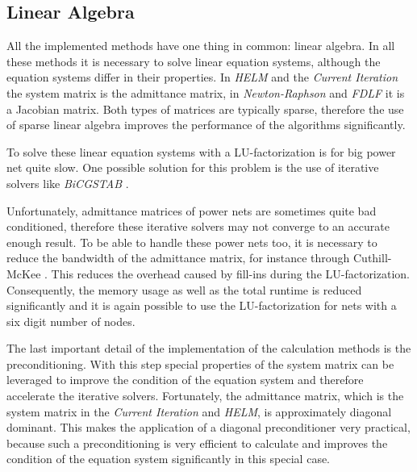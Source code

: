 \subsection{Linear Algebra}
All the implemented methods have one thing in common: linear algebra. In all these methods it is necessary to solve linear equation systems, although the equation systems differ in their properties. In \emph{HELM} and the \emph{Current Iteration} the system matrix is the admittance matrix, in \emph{Newton-Raphson} and \emph{FDLF} it is a Jacobian matrix. Both types of matrices are typically sparse, therefore the use of sparse linear algebra improves the performance of the algorithms significantly.

To solve these linear equation systems with a LU-factorization is for big power net quite slow. One possible  solution for this problem is the use of iterative solvers like \emph{BiCGSTAB} \cite{bicgstab}.

Unfortunately, admittance matrices of power nets are sometimes quite bad conditioned, therefore these iterative solvers may not converge to an accurate enough result. To be able to handle these power nets too, it is necessary to reduce the bandwidth of the admittance matrix, for instance through Cuthill-McKee \cite{cuthill}. This reduces the overhead caused by fill-ins during the LU-factorization. Consequently, the memory usage as well as the total runtime is reduced significantly and it is again possible to use the LU-factorization for nets with a six digit number of nodes.

The last important detail of the implementation of the calculation methods is the preconditioning. With this step special properties of the system matrix can be leveraged to improve the condition of the equation system and therefore accelerate the iterative solvers. Fortunately, the admittance matrix, which is the system matrix in the \emph{Current Iteration} and \emph{HELM}, is approximately diagonal dominant. This makes the application of a diagonal preconditioner very practical, because such a preconditioning is very efficient to calculate and improves the condition of the equation system significantly in this special case.

